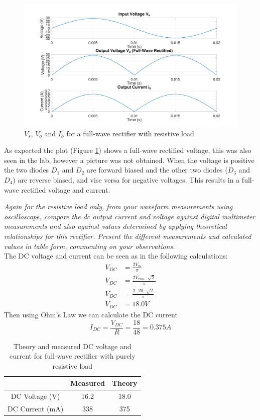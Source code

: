 \documentclass[12pt,a4paper]{article}
\begin{document}
\begin{figure}[H]
\centering
\includegraphics[width=.9\linewidth]{ENG306_Lab_2_Full_Wave_Rectifier.png}
\caption{\(V_s\), \(V_o\) and \(I_o\) for a full-wave rectifier with resistive load \label{fig:figure2}}
\end{figure}

As expected the plot (Figure \ref{fig:figure2}) shows a full-wave rectified voltage, this was also seen in the lab, however a picture was not obtained. When the voltage is positive the two diodes $D_1$ and $D_2$ are forward biased and the other two diodes ($D_3$ and $D_4$) are reverse biased, and vise versa for negative voltages. This results in a full-wave rectified voltage and current.

\textit{Again for the resistive load only, from your waveform measurements using oscilloscope, compare
the dc output current and voltage against digital multimeter measurements and also against values
determined by applying theoretical relationships for this rectifier. Present the different measurements
and calculated values in table form, commenting on your observations.}\\

The DC voltage and current can be seen as in the following calculations:
\begin{align*}
V_{DC} &= \frac{2V_m}{\pi} \\
V_{DC} &= \frac{2V_{rms}\cdot\sqrt{2}}{\pi} \\
V_{DC} &= \frac{2 \cdot 20\cdot\sqrt{2}}{\pi} \\
V_{DC} &= 18.0V
\end{align*}
Then using Ohm's Law we can calculate the DC current
\[I_{DC} = \frac{V_{DC}}{R} = \frac{18}{48} = 0.375A\]

\begin{table}[H]
\caption{Theory and measured DC voltage and current for full-wave rectifier with purely resistive load \label{tab:table2}}
\centering
\begin{tabular}{|c|c|c|}
\hline
 & Measured & Theory\\
\hline
DC Voltage (V) & 16.2 & 18.0\\
\hline
DC Current (mA) & 338 & 375\\
\hline
\end{tabular}
\end{table}
\end{document}

